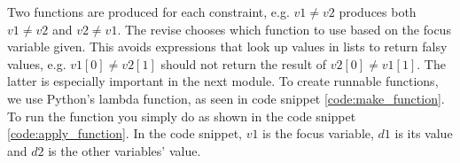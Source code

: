 

Two functions are produced for each constraint, e.g. \( v1 \neq v2 \) produces both \(v1 \neq v2 \) and \(v2 \neq v1 \). The revise chooses which function to use based on the focus variable given. This avoids expressions that look up values in lists to return falsy values, e.g. \( v1[0] \neq v2[1] \) should not return the result of \( v2[0] \neq v1[1] \). The latter is especially important in the next module. To create runnable functions, we use Python's lambda function, as seen in code snippet \ref{code:make_function}. To run the function you simply do as shown in the code snippet \ref{code:apply_function}. In the code snippet, \(v1\) is the focus variable, \(d1\) is its value and \(d2\) is the other variables' value.

